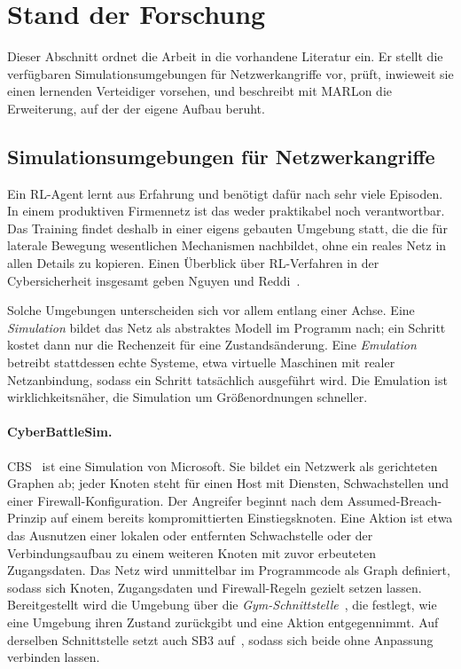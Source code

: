 \section{Stand der Forschung}
\label{sec:sota}

Dieser Abschnitt ordnet die Arbeit in die vorhandene Literatur ein. Er
stellt die verfügbaren Simulationsumgebungen für Netzwerkangriffe vor,
prüft, inwieweit sie einen lernenden Verteidiger vorsehen, und beschreibt
mit MARLon die Erweiterung, auf der der eigene Aufbau beruht.

\subsection{Simulationsumgebungen für Netzwerkangriffe}
\label{sec:umgebungen}

Ein \ac{RL}-Agent lernt aus Erfahrung und benötigt dafür nach
 sehr viele Episoden. In einem produktiven
Firmennetz ist das weder praktikabel noch verantwortbar. Das Training findet
deshalb in einer eigens gebauten Umgebung statt, die die für laterale Bewegung
wesentlichen Mechanismen nachbildet, ohne ein reales Netz in allen Details zu
kopieren. Einen Überblick über \ac{RL}-Verfahren in der Cybersicherheit
insgesamt geben Nguyen und Reddi~\cite{nguyen2023drl}.

Solche Umgebungen unterscheiden sich vor allem entlang einer Achse. Eine
\emph{Simulation} bildet das Netz als abstraktes Modell im Programm nach; ein
Schritt kostet dann nur die Rechenzeit für eine Zustandsänderung. Eine
\emph{Emulation} betreibt stattdessen echte Systeme, etwa virtuelle Maschinen
mit realer Netzanbindung, sodass ein Schritt tatsächlich ausgeführt wird. Die
Emulation ist wirklichkeitsnäher, die Simulation um Größenordnungen schneller.

\paragraph{CyberBattleSim.}
\ac{CBS}~\cite{cyberbattlesim2021} ist eine Simulation von Microsoft. Sie bildet
ein Netzwerk als gerichteten Graphen ab; jeder Knoten steht für einen Host mit
Diensten, Schwachstellen und einer Firewall-Konfiguration. Der Angreifer beginnt
nach dem Assumed-Breach-Prinzip auf einem bereits kompromittierten
Einstiegsknoten. Eine Aktion ist etwa das Ausnutzen einer lokalen oder
entfernten Schwachstelle oder der Verbindungsaufbau zu einem weiteren Knoten mit
zuvor erbeuteten Zugangsdaten. Das Netz wird unmittelbar im Programmcode als
Graph definiert, sodass sich Knoten, Zugangsdaten und Firewall-Regeln gezielt
setzen lassen. Bereitgestellt wird die Umgebung über die
\emph{Gym-Schnittstelle}~\cite{cyberbattlesim2021}, die festlegt, wie eine
Umgebung ihren Zustand zurückgibt und eine Aktion entgegennimmt. Auf derselben
Schnittstelle setzt auch \ac{SB3} auf~\cite{stablebaselines3}, sodass sich beide
ohne Anpassung verbinden lassen.

